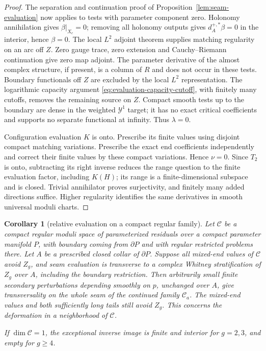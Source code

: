 \documentclass[11pt]{amsart}
\newtheorem{corollary}[theorem]{Corollary}
\theoremstyle{definition}
\theoremstyle{remark}
\theoremstyle{plain}
\newcommand{\cC}{\mathcal{C}}
\begin{document}
\begin{proof}
The separation and continuation proof of
Proposition~\ref{lem:seam-evaluation} now applies to tests
with parameter component zero. Holonomy annihilation gives
$\beta|_{X_c}=0$; removing all holonomy outputs gives
$d_A^{+,*}\beta=0$ in the interior, hence $\beta=0$.
The local $L^2$ adjoint theorem supplies matching regularity
on an arc off $Z$. Zero gauge trace, zero extension and
Cauchy--Riemann continuation give zero map adjoint.
The parameter derivative of the almost complex structure,
if present, is a column of $R$ and does not occur in these
tests. Boundary functionals off $Z$ are excluded by the
local $L^2$ representation. The logarithmic capacity
argument \eqref{eq:evaluation-capacity-cutoff}, with finitely
many cutoffs, removes the remaining source on $Z$.
Compact smooth tests up to the boundary are dense in the
weighted $\mathcal Y^1$ target; it has no exact critical
coefficients and supports no separate functional at infinity.
Thus $\lambda=0$.

Configuration evaluation $K$ is onto. Prescribe its finite
values using disjoint compact matching variations. Prescribe
the exact end coefficients independently and correct their
finite values by these compact variations. Hence $\nu=0$.
Since $T_2$ is onto, subtracting its right inverse reduces
the range question to the finite evaluation factor, including
$K(H)$; its range is a finite-dimensional subspace and is
closed. Trivial annihilator proves surjectivity, and finitely
many added directions suffice. Higher regularity identifies
the same derivatives in smooth universal moduli charts.
\end{proof}

\begin{corollary}[relative evaluation on a compact regular family]
\label{cor:relative-residual-evaluation}
Let $\cC$ be a compact regular moduli space of parameterized
residuals over a compact parameter manifold $P$, with boundary
coming from $\partial P$ and with regular restricted problems
there. Let $A$ be a prescribed closed collar of $\partial P$.
Suppose all mixed-end values of $\cC$ avoid $Z_g$, and seam
evaluation is transverse to a complex Whitney stratification of
$Z_g$ over $A$, including the boundary restriction.
Then arbitrarily small finite secondary perturbations depending
smoothly on $p$, unchanged over $A$, give transversality on the
whole seam of the continued family $\cC_a$. The mixed-end
values and both sufficiently long tails still avoid $Z_g$.
This concerns the deformation in a neighborhood of $\cC$.

If $\dim\cC=1$, the exceptional inverse image is finite and
interior for $g=2,3$, and empty for $g\geq4$.
\end{corollary}
\end{document}
